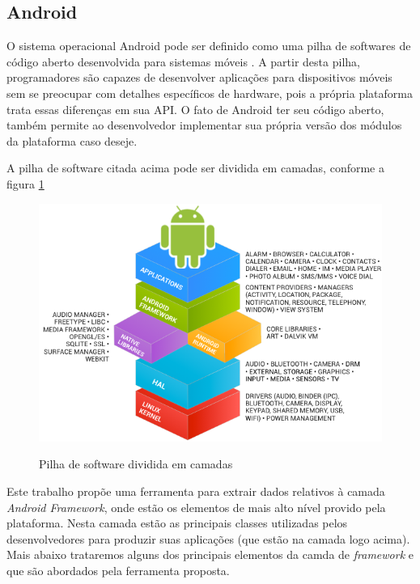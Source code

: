 \documentclass[a4paper,12pt]{article}
\numberwithin{figure}{section}
\begin{document}
\subsection{Android}%
O sistema operacional Android pode ser definido como uma pilha de softwares de código aberto desenvolvida para sistemas móveis \cite{androidSource}. A partir desta pilha, programadores são capazes de desenvolver aplicações para dispositivos móveis sem se preocupar com detalhes específicos de hardware, pois a própria plataforma trata essas diferenças em sua API. O fato de Android ter seu código aberto, também permite ao desenvolvedor implementar sua própria versão dos módulos da plataforma caso deseje.

A pilha de software citada acima pode ser dividida em camadas, conforme a figura \ref{fig:androidStack}

\begin{figure}[h]
\centering
\includegraphics[width=\linewidth]{imgs/android_framework_details.png}
\label{fig:androidStack}
\caption{Pilha de software dividida em camadas \cite{androidSource}}
\end{figure}

Este trabalho propõe uma ferramenta para extrair dados relativos à camada \textit{Android Framework}, onde estão os elementos de mais alto nível provido pela plataforma. Nesta camada estão as principais classes utilizadas pelos desenvolvedores para produzir suas aplicações (que estão na camada logo acima). Mais abaixo trataremos alguns dos principais elementos da camda de \textit{framework} e que são abordados pela ferramenta proposta.

\end{document}
